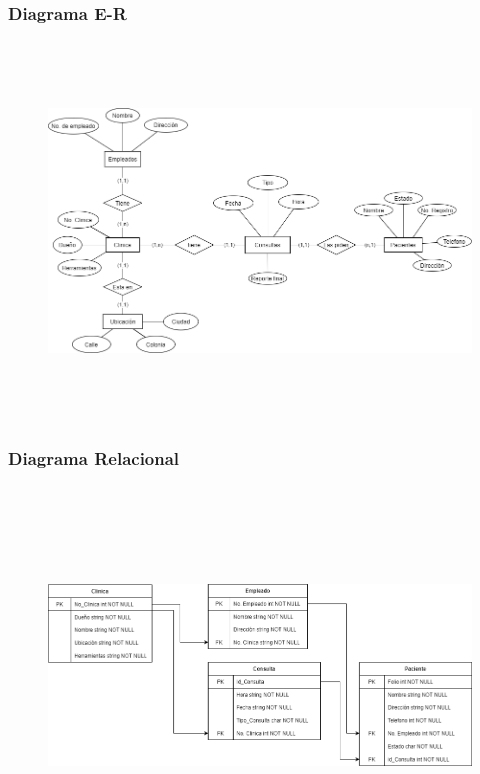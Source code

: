 \documentclass[a4paper, 12pt]{article}
\begin{document}
\begin{justify}
        \subsubsection{Diagrama E-R}
        \begin{figure}[H]
            \centering
            \includegraphics[width=16cm,height=10cm]{er7.png}
        \end{figure}
        \subsubsection{Diagrama Relacional}
        \begin{figure}[H]
            \centering
            \includegraphics[width=16cm,height=10cm]{rel7.png}
        \end{figure}

\end{justify}
\end{document}
